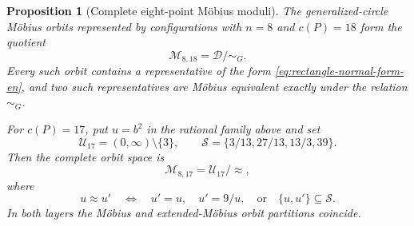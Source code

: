 \documentclass[11pt,a4paper]{article}
\newtheorem{proposition}[theorem]{Proposition}
\theoremstyle{definition}
\begin{document}
\begin{proposition}[Complete eight-point Möbius moduli]
\label{prop:n8-complete-moduli-en}
The generalized-circle Möbius orbits represented by configurations with
$n=8$ and $c(P)=18$ form the quotient
\[
 \mathcal M_{8,18}=\mathcal D/{\sim_G}.
\]
Every such orbit contains a representative of the form
\eqref{eq:rectangle-normal-form-en}, and two such representatives are Möbius
equivalent exactly under the relation $\sim_G$.

For $c(P)=17$, put $u=b^2$ in the rational family above and set
\[
 \mathcal U_{17}=(0,\infty)\setminus\{3\},\qquad
 \mathcal S=\{3/13,27/13,13/3,39\}.
\]
Then the complete orbit space is
\[
 \mathcal M_{8,17}=\mathcal U_{17}/{\approx},
\]
where
\begin{equation}\label{eq:c17-equivalence-en}
u\approx u'
\quad\Longleftrightarrow\quad
u'=u,\quad u'=9/u,
\quad\text{or}\quad \{u,u'\}\subseteq\mathcal S.
\end{equation}
In both layers the Möbius and extended-Möbius orbit partitions coincide.
\end{proposition}
\end{document}
